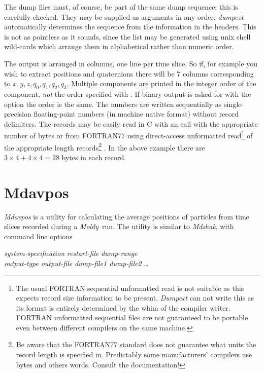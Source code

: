 \documentclass[a4paper,twoside]{report}
\newcommand{\moldy}{\emph{Moldy}}
\begin{document}
The dump files must, of course, be part of the same dump sequence;
this is carefully checked.  They may be supplied as arguments in any
order; \emph{dumpext} automatically determines the sequence from
the information in the headers.  This is not as pointless as it sounds,
since the list may be generated using unix shell wild-cards which arrange
them in alphabetical rather than numeric order.

The output is arranged in columns, one line per time slice.  So if,
for example you wish to extract positions and quaternions there will
be 7 columns corresponding to $x,y,z,q_0,q_1,q_2,q_3$. Multiple
components are printed in the integer order of the component,
\emph{not} the order specified with . If binary output is
asked for with the  option the order is the same. The numbers
are written sequentially as single-precision floating-point numbers
(in machine native format) without record delimiters.  The records may
be easily read in C with an  call with the appropriate
number of bytes or from FORTRAN77 using direct-access unformatted
read\footnote{The usual FORTRAN sequential unformatted read is not
  suitable as this expects record size information to be present.
  \emph{Dumpext} can not write this as its format is entirely
  determined by the whim of the compiler writer.  FORTRAN unformatted
  sequential files are not guaranteed to be portable even between
  different compilers on the same machine.} of the appropriate length
records\footnote{Be aware that the FORTRAN77 standard does not
  guarantee what units the record length is specified in.  Predictably
  some manufacturers' compilers use bytes and others words.  Consult
  the documentation!} .  In
the above example there are $3 \times 4 + 4 \times 4 = 28$ bytes in
each record.

\section{Mdavpos}%

\emph{Mdavpos} is a utility for calculating the average positions of particles
from time slices recorded during a \moldy\ run. The utility is similar to
\emph{Mdshak}, with command line options

\begin{center}
 \textit{system-specification} \Lit{|}
 \textit{restart-file}
\Lit{[-t} \textit{dump-range}\Lit{]} \\
\Lit{[-f} \textit{output-type}\Lit{]} 
\Lit{[-a]}
\Lit{[-l]}
\Lit{[-i]}
\Lit{[-v]} 
\Lit{[-o} \textit{output-file}\Lit{]}
\textit{dump-file1 dump-file2} \ldots
\end{center}
\end{document}
